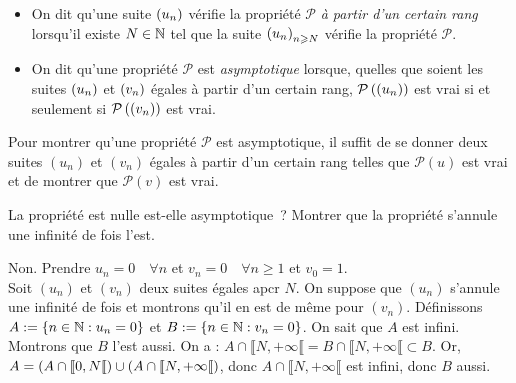 \documentclass{magnoliaold}
\begin{document}
\begin{definition}[utile=-3]
\begin{itemize}
\item On dit qu'une suite $\left(u_n\right)$ vérifie la propriété $\mathcal{P}$ \emph{à partir
  d'un certain rang} lorsqu'il existe $N\in\mathbb{N}$ tel que la suite
  $\left(u_n\right)_{n\geqslant N}$ vérifie la propriété $\mathcal{P}$.
\item On dit qu'une propriété $\mathcal{P}$ est \emph{asymptotique} lorsque, quelles que
  soient les suites $\left(u_n\right)$ et $\left(v_n\right)$ égales à partir d'un certain rang,
  $\mathcal{P}\left(\left(u_n\right)\right)$ est vrai si et seulement si $\mathcal{P}\left(\left(v_n\right)\right)$
  est vrai.
\end{itemize}
\end{definition}

\begin{remarqueUnique}
\remarque Pour montrer qu'une propriété $\mathcal{P}$ est asymptotique, il
  suffit de se donner deux suites $(u_n)$ et $(v_n)$ égales à partir d'un
  certain rang telles que $\mathcal{P}(u)$ est vrai et de montrer que
  $\mathcal{P}(v)$ est vrai.
\end{remarqueUnique}

\begin{exoUnique}
\exo La propriété \og est nulle \fg est-elle asymptotique~? Montrer que la
  propriété \og s'annule une infinité de fois \fg l'est.
\end{exoUnique}

\begin{sol}
Non. Prendre $u_n=0 \quad \forall n$ et $v_n=0 \quad \forall n\geq 1$ et $v_0=1$.\\
Soit $(u_n)$ et $(v_n)$ deux suites égales apcr $N$. On suppose que $(u_n)$ s'annule une infinité de fois et montrons qu'il en est de même pour $(v_n)$. Définissons $A:=\left\{n\in\mathbb{N} : u_n=0\right\}$ et $B:=\left\{n\in\mathbb{N} : v_n=0\right\}$. On sait que $A$ est infini. Montrons que $B$ l'est aussi.
On a : $A\cap \llbracket N,+\infty \llbracket=B\cap \llbracket N,+\infty \llbracket \subset B.$ Or, $A=\left(A\cap \llbracket 0,N \llbracket \right)\cup \left(A\cap \llbracket N,+\infty \llbracket\right)$, donc $A\cap \llbracket N,+\infty \llbracket$ est infini, donc $B$ aussi.

\end{sol}

\end{document}

